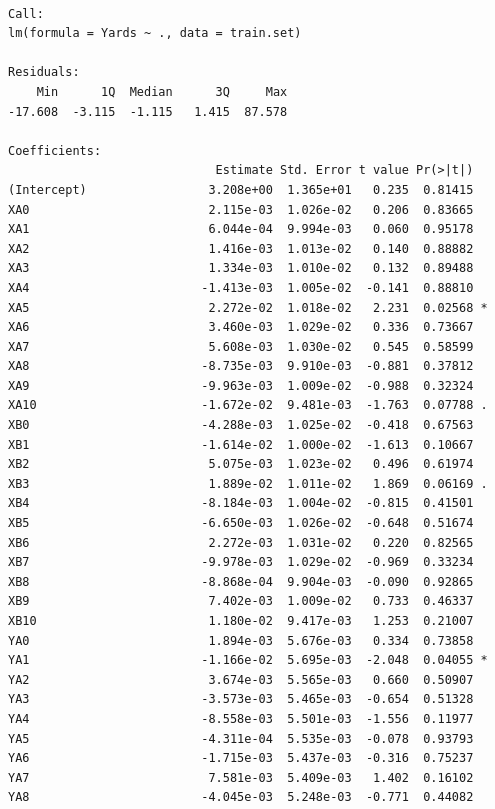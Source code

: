 \documentclass[
  super,
  preprint,
  3p]{elsarticle}
\begin{document}
\begin{verbatim}

Call:
lm(formula = Yards ~ ., data = train.set)

Residuals:
    Min      1Q  Median      3Q     Max 
-17.608  -3.115  -1.115   1.415  87.578 

Coefficients:
                             Estimate Std. Error t value Pr(>|t|)    
(Intercept)                 3.208e+00  1.365e+01   0.235  0.81415    
XA0                         2.115e-03  1.026e-02   0.206  0.83665    
XA1                         6.044e-04  9.994e-03   0.060  0.95178    
XA2                         1.416e-03  1.013e-02   0.140  0.88882    
XA3                         1.334e-03  1.010e-02   0.132  0.89488    
XA4                        -1.413e-03  1.005e-02  -0.141  0.88810    
XA5                         2.272e-02  1.018e-02   2.231  0.02568 *  
XA6                         3.460e-03  1.029e-02   0.336  0.73667    
XA7                         5.608e-03  1.030e-02   0.545  0.58599    
XA8                        -8.735e-03  9.910e-03  -0.881  0.37812    
XA9                        -9.963e-03  1.009e-02  -0.988  0.32324    
XA10                       -1.672e-02  9.481e-03  -1.763  0.07788 .  
XB0                        -4.288e-03  1.025e-02  -0.418  0.67563    
XB1                        -1.614e-02  1.000e-02  -1.613  0.10667    
XB2                         5.075e-03  1.023e-02   0.496  0.61974    
XB3                         1.889e-02  1.011e-02   1.869  0.06169 .  
XB4                        -8.184e-03  1.004e-02  -0.815  0.41501    
XB5                        -6.650e-03  1.026e-02  -0.648  0.51674    
XB6                         2.272e-03  1.031e-02   0.220  0.82565    
XB7                        -9.978e-03  1.029e-02  -0.969  0.33234    
XB8                        -8.868e-04  9.904e-03  -0.090  0.92865    
XB9                         7.402e-03  1.009e-02   0.733  0.46337    
XB10                        1.180e-02  9.417e-03   1.253  0.21007    
YA0                         1.894e-03  5.676e-03   0.334  0.73858    
YA1                        -1.166e-02  5.695e-03  -2.048  0.04055 *  
YA2                         3.674e-03  5.565e-03   0.660  0.50907    
YA3                        -3.573e-03  5.465e-03  -0.654  0.51328    
YA4                        -8.558e-03  5.501e-03  -1.556  0.11977    
YA5                        -4.311e-04  5.535e-03  -0.078  0.93793    
YA6                        -1.715e-03  5.437e-03  -0.316  0.75237    
YA7                         7.581e-03  5.409e-03   1.402  0.16102    
YA8                        -4.045e-03  5.248e-03  -0.771  0.44082    

\end{verbatim}
\end{document}
